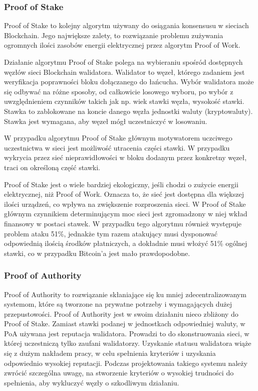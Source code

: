 \documentclass[a4paper,13pt]{report}
\begin{document}
\subsubsection{Proof of Stake}

Proof of Stake to kolejny algorytm używany do osiągania konsensusu w sieciach Blockchain. Jego największe zalety, to rozwiązanie problemu zużywania ogromnych ilości zasobów energii elektrycznej przez algorytm Proof of Work.

Działanie algorytmu Proof of Stake polega na wybieraniu spośród dostępnych węzłów sieci Blockchain walidatora. Walidator to węzeł, którego zadaniem jest weryfikacja poprawności bloku dołączanego do łańcucha. Wybór walidatora może się odbywać na różne sposoby, od całkowicie losowego wyboru, po wybór z uwzględnieniem czynników takich jak np. wiek stawki węzła, wysokość stawki. Stawka to zablokowane na koncie danego węzła jednostki waluty (kryptowaluty). Stawka jest wymagana, aby węzeł mógł uczestniczyć w losowaniu.

W przypadku algorytmu Proof of Stake głównym motywatorem uczciwego uczestnictwa w sieci jest możliwość utracenia części stawki. W przypadku wykrycia przez sieć nieprawidłowości w bloku dodanym przez konkretny węzeł, traci on określoną część stawki.

Proof of Stake jest o wiele bardziej ekologiczny, jeśli chodzi o zużycie energii elektrycznej, niż Proof of Work. Oznacza to, że sieć jest dostępna dla większej ilości urządzeń, co wpływa na zwiększenie rozproszenia sieci. W Proof of Stake głównym czynnikiem determinującym moc sieci jest zgromadzony w niej wkład finansowy w postaci stawek. W przypadku tego algorytmu również występuje problem ataku 51\%, jednakże tym razem atakujący musi dysponować odpowiednią ilością środków płatniczych, a dokładnie musi włożyć  51\% ogólnej stawki, co w przypadku Bitcoin'a jest mało prawdopodobne.

\subsubsection{Proof of Authority}
Proof of Authority to rozwiązanie skłaniające się ku mniej zdecentralizowanym systemom, które są tworzone na prywatne potrzeby i wymagających dużej przepustowości. Proof of Authority jest w swoim działaniu nieco zbliżony do Proof of Stake. Zamiast stawki podanej w jednostkach odpowiedniej waluty, w PoA używana jest reputacja walidatora. Prowadzi to do skonstruowania sieci, w której uczestniczą tylko zaufani walidatorzy. Uzyskanie statusu walidatora wiąże się z dużym nakładem pracy, w celu spełnienia kryteriów i uzyskania odpowiednio wysokiej reputacji. Podczas projektowania takiego systemu należy zwrócić szczególna uwagę, na stworzenie kryteriów o wysokiej trudności do spełnienia, aby wykluczyć węzły o szkodliwym działaniu.
\end{document}
